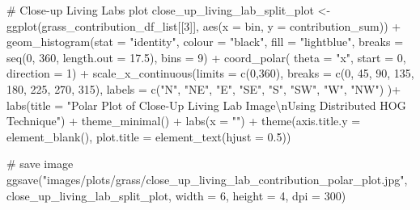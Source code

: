 \documentclass[
  letterpaper,
  DIV=11,
  numbers=noendperiod]{scrreprt}
\newenvironment{Shaded}{\begin{snugshade}}{\end{snugshade}}
\newcommand{\AttributeTok}[1]{\textcolor[rgb]{0.40,0.45,0.13}{#1}}
\newcommand{\CommentTok}[1]{\textcolor[rgb]{0.37,0.37,0.37}{#1}}
\newcommand{\DecValTok}[1]{\textcolor[rgb]{0.68,0.00,0.00}{#1}}
\newcommand{\FloatTok}[1]{\textcolor[rgb]{0.68,0.00,0.00}{#1}}
\newcommand{\FunctionTok}[1]{\textcolor[rgb]{0.28,0.35,0.67}{#1}}
\newcommand{\NormalTok}[1]{\textcolor[rgb]{0.00,0.23,0.31}{#1}}
\newcommand{\OtherTok}[1]{\textcolor[rgb]{0.00,0.23,0.31}{#1}}
\newcommand{\SpecialCharTok}[1]{\textcolor[rgb]{0.37,0.37,0.37}{#1}}
\newcommand{\StringTok}[1]{\textcolor[rgb]{0.13,0.47,0.30}{#1}}
\begin{document}
\begin{Shaded}
\begin{Highlighting}[]
\CommentTok{\# Close{-}up Living Labs plot}
\NormalTok{close\_up\_living\_lab\_split\_plot }\OtherTok{\textless{}{-}}
  \FunctionTok{ggplot}\NormalTok{(grass\_contribution\_df\_list[[}\DecValTok{3}\NormalTok{]], }
         \FunctionTok{aes}\NormalTok{(}\AttributeTok{x =}\NormalTok{ bin, }\AttributeTok{y =}\NormalTok{ contribution\_sum)) }\SpecialCharTok{+}
  \FunctionTok{geom\_histogram}\NormalTok{(}\AttributeTok{stat =} \StringTok{"identity"}\NormalTok{,}
                 \AttributeTok{colour =} \StringTok{"black"}\NormalTok{, }
                 \AttributeTok{fill =} \StringTok{"lightblue"}\NormalTok{, }
                 \AttributeTok{breaks =} \FunctionTok{seq}\NormalTok{(}\DecValTok{0}\NormalTok{, }\DecValTok{360}\NormalTok{, }\AttributeTok{length.out =} \FloatTok{17.5}\NormalTok{),}
                 \AttributeTok{bins =} \DecValTok{9}\NormalTok{) }\SpecialCharTok{+}
  \FunctionTok{coord\_polar}\NormalTok{(}
    \AttributeTok{theta =} \StringTok{"x"}\NormalTok{, }
    \AttributeTok{start =} \DecValTok{0}\NormalTok{, }
    \AttributeTok{direction =} \DecValTok{1}\NormalTok{) }\SpecialCharTok{+}
  \FunctionTok{scale\_x\_continuous}\NormalTok{(}\AttributeTok{limits =} \FunctionTok{c}\NormalTok{(}\DecValTok{0}\NormalTok{,}\DecValTok{360}\NormalTok{),}
    \AttributeTok{breaks =} \FunctionTok{c}\NormalTok{(}\DecValTok{0}\NormalTok{, }\DecValTok{45}\NormalTok{, }\DecValTok{90}\NormalTok{, }\DecValTok{135}\NormalTok{, }\DecValTok{180}\NormalTok{, }\DecValTok{225}\NormalTok{, }\DecValTok{270}\NormalTok{, }\DecValTok{315}\NormalTok{), }
    \AttributeTok{labels =} \FunctionTok{c}\NormalTok{(}\StringTok{"N"}\NormalTok{, }\StringTok{"NE"}\NormalTok{, }\StringTok{"E"}\NormalTok{, }\StringTok{"SE"}\NormalTok{, }\StringTok{"S"}\NormalTok{, }\StringTok{"SW"}\NormalTok{, }\StringTok{"W"}\NormalTok{, }\StringTok{"NW"}\NormalTok{)}
\NormalTok{  )}\SpecialCharTok{+}
  \FunctionTok{labs}\NormalTok{(}\AttributeTok{title =} \StringTok{"Polar Plot of Close{-}Up Living Lab Image}\SpecialCharTok{\textbackslash{}n}\StringTok{Using Distributed HOG Technique"}\NormalTok{) }\SpecialCharTok{+}
  \FunctionTok{theme\_minimal}\NormalTok{() }\SpecialCharTok{+}
  \FunctionTok{labs}\NormalTok{(}\AttributeTok{x =} \StringTok{""}\NormalTok{) }\SpecialCharTok{+}
  \FunctionTok{theme}\NormalTok{(}\AttributeTok{axis.title.y =} \FunctionTok{element\_blank}\NormalTok{(),}
        \AttributeTok{plot.title =} \FunctionTok{element\_text}\NormalTok{(}\AttributeTok{hjust =} \FloatTok{0.5}\NormalTok{))}

\CommentTok{\# save image}
\FunctionTok{ggsave}\NormalTok{(}\StringTok{"images/plots/grass/close\_up\_living\_lab\_contribution\_polar\_plot.jpg"}\NormalTok{, close\_up\_living\_lab\_split\_plot, }\AttributeTok{width =} \DecValTok{6}\NormalTok{, }\AttributeTok{height =} \DecValTok{4}\NormalTok{, }\AttributeTok{dpi =} \DecValTok{300}\NormalTok{)}
\end{Highlighting}
\end{Shaded}
\end{document}
